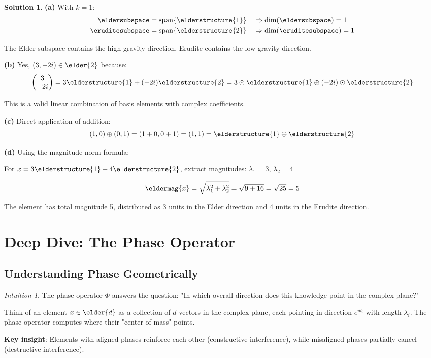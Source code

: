 \documentclass[12pt,a4paper]{book}
\theoremstyle{definition}
\newtheorem{solution}{Solution}[section]
\theoremstyle{remark}
\newtheorem*{intuition}{Intuition}
\begin{document}
\begin{solution}
\textbf{(a)} With $k=1$:
\begin{align}
\eldersubspace &= \mathrm{span}\{\elderstructure{1}\} \quad \Rightarrow \dim(\eldersubspace) = 1\\
\eruditesubspace &= \mathrm{span}\{\elderstructure{2}\} \quad \Rightarrow \dim(\eruditesubspace) = 1
\end{align}

The Elder subspace contains the high-gravity direction, Erudite contains the low-gravity direction.

\textbf{(b)} Yes, $(3, -2i) \in \elder{2}$ because:
$$\begin{pmatrix} 3 \\ -2i \end{pmatrix} = 3\elderstructure{1} + (-2i)\elderstructure{2} = 3 \odot \elderstructure{1} \oplus (-2i) \odot \elderstructure{2}$$

This is a valid linear combination of basis elements with complex coefficients.

\textbf{(c)} Direct application of addition:
$$(1, 0) \oplus (0, 1) = (1+0, 0+1) = (1, 1) = \elderstructure{1} \oplus \elderstructure{2}$$

\textbf{(d)} Using the magnitude norm formula:

For $x = 3\elderstructure{1} + 4\elderstructure{2}$, extract magnitudes: $\lambda_1 = 3$, $\lambda_2 = 4$

$$\eldermag{x} = \sqrt{\lambda_1^2 + \lambda_2^2} = \sqrt{9 + 16} = \sqrt{25} = 5$$

The element has total magnitude 5, distributed as 3 units in the Elder direction and 4 units in the Erudite direction.
\end{solution}

\section{Deep Dive: The Phase Operator}

\subsection{Understanding Phase Geometrically}

\begin{intuition}
The phase operator $\Phi$ answers the question: "In which overall direction does this knowledge point in the complex plane?"

Think of an element $x \in \elder{d}$ as a collection of $d$ vectors in the complex plane, each pointing in direction $e^{i\theta_i}$ with length $\lambda_i$. The phase operator computes where their "center of mass" points.

\textbf{Key insight}: Elements with aligned phases reinforce each other (constructive interference), while misaligned phases partially cancel (destructive interference).
\end{intuition}
\end{document}
